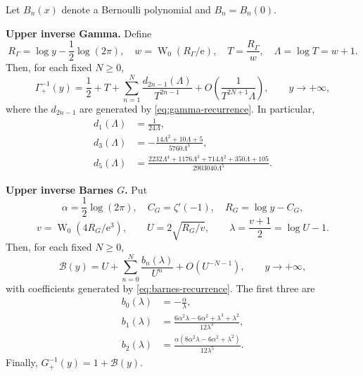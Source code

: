 \documentclass[11pt,oneside]{article}
\theoremstyle{plain}
\theoremstyle{definition}
\theoremstyle{remark}
\newcommand{\W}{\operatorname{W}}
\newcommand{\e}{\mathrm{e}}
\newcommand{\Bcal}{\mathcal{B}}
\begin{document}
\begin{mainbox}
Let \(B_n(x)\) denote a Bernoulli polynomial and \(B_n=B_n(0)\).

\textbf{Upper inverse Gamma.}  Define
\begin{equation}
 R_\Gamma=\log y-\frac12\log(2\pi),\quad
 w=\W_0(R_\Gamma/\e),\quad
 T=\frac{R_\Gamma}{w},\quad
 \Lambda=\log T=w+1.
 \label{eq:gamma-core-summary}
\end{equation}
Then, for each fixed \(N\ge0\),
\begin{equation}
 \Gamma_+^{-1}(y)
 =\frac12+T+\sum_{n=1}^{N}
   \frac{d_{2n-1}(\Lambda)}{T^{2n-1}}
 +O\!\left(\frac{1}{T^{2N+1}\Lambda}\right),
 \qquad y\to+\infty,
 \label{eq:gamma-summary}
\end{equation}
where the \(d_{2n-1}\) are generated by \cref{eq:gamma-recurrence}.  In
particular,
\begin{align}
 d_1(\Lambda)&=\frac{1}{24\Lambda},\label{eq:gamma-d1-summary}\\
 d_3(\Lambda)&=-\frac{14\Lambda^2+10\Lambda+5}
 {5760\Lambda^3},\label{eq:gamma-d3-summary}\\
 d_5(\Lambda)&=\frac{2232\Lambda^4+1176\Lambda^3+714\Lambda^2
 +350\Lambda+105}{2903040\Lambda^5}.
 \label{eq:gamma-d5-summary}
\end{align}

\textbf{Upper inverse Barnes \(G\).}  Put
\begin{equation}
 \alpha=\frac12\log(2\pi),\quad C_G=\zeta'(-1),\quad
 R_G=\log y-C_G,
 \label{eq:barnes-constants-summary}
\end{equation}
\begin{equation}
 v=\W_0(4R_G/\e^3),\qquad
 U=2\sqrt{R_G/v},\qquad
 \lambda=\frac{v+1}{2}=\log U-1.
 \label{eq:barnes-core-summary}
\end{equation}
Then, for each fixed \(N\ge0\),
\begin{equation}
 \Bcal(y)=U+\sum_{n=0}^{N}\frac{b_n(\lambda)}{U^n}
 +O(U^{-N-1}),
 \qquad y\to+\infty,
 \label{eq:barnes-summary}
\end{equation}
with coefficients generated by \cref{eq:barnes-recurrence}.  The first three
are
\begin{align}
 b_0(\lambda)&=-\frac{\alpha}{\lambda},
 \label{eq:barnes-b0-summary}\\
 b_1(\lambda)&=
 \frac{6\alpha^2\lambda-6\alpha^2+\lambda^3+\lambda^2}
 {12\lambda^3},
 \label{eq:barnes-b1-summary}\\
 b_2(\lambda)&=
 \frac{\alpha(8\alpha^2\lambda-6\alpha^2+\lambda^2)}
 {12\lambda^5}.
 \label{eq:barnes-b2-summary}
\end{align}
Finally, \(G_+^{-1}(y)=1+\Bcal(y)\).
\end{mainbox}
\end{document}
